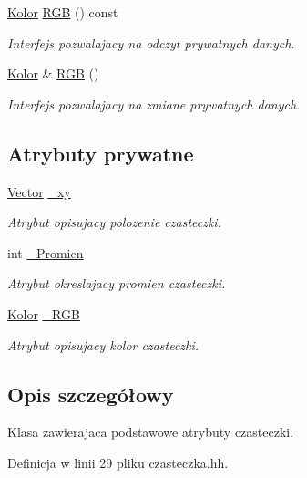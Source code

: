 \begin{DoxyCompactItemize}
\hyperlink{class_kolor}{Kolor} \hyperlink{class_czasteczka_a546104013fe302440214f8809d7ec602}{R\-G\-B} () const 
\begin{DoxyCompactList}\small\item\em Interfejs pozwalajacy na odczyt prywatnych danych. \end{DoxyCompactList}\item 
\hyperlink{class_kolor}{Kolor} \& \hyperlink{class_czasteczka_aa70b19b0f59c5e4b244a9ff203d6de41}{R\-G\-B} ()
\begin{DoxyCompactList}\small\item\em Interfejs pozwalajacy na zmiane prywatnych danych. \end{DoxyCompactList}\end{DoxyCompactItemize}
\subsection*{Atrybuty prywatne}
\begin{DoxyCompactItemize}
\item 
\hyperlink{class_vector}{Vector} \hyperlink{class_czasteczka_a025a3ee895f8ee9c765814cfca1fd5e1}{\-\_\-xy}
\begin{DoxyCompactList}\small\item\em Atrybut opisujacy polozenie czasteczki. \end{DoxyCompactList}\item 
int \hyperlink{class_czasteczka_a5a1d126d89bd571c79a5691c45e2f469}{\-\_\-\-Promien}
\begin{DoxyCompactList}\small\item\em Atrybut okreslajacy promien czasteczki. \end{DoxyCompactList}\item 
\hyperlink{class_kolor}{Kolor} \hyperlink{class_czasteczka_ab9c93cfb3cf0360579ad0def2a94178c}{\-\_\-\-R\-G\-B}
\begin{DoxyCompactList}\small\item\em Atrybut opisujacy kolor czasteczki. \end{DoxyCompactList}\end{DoxyCompactItemize}


\subsection{Opis szczegółowy}
Klasa zawierajaca podstawowe atrybuty czasteczki. 

Definicja w linii 29 pliku czasteczka.\-hh.



